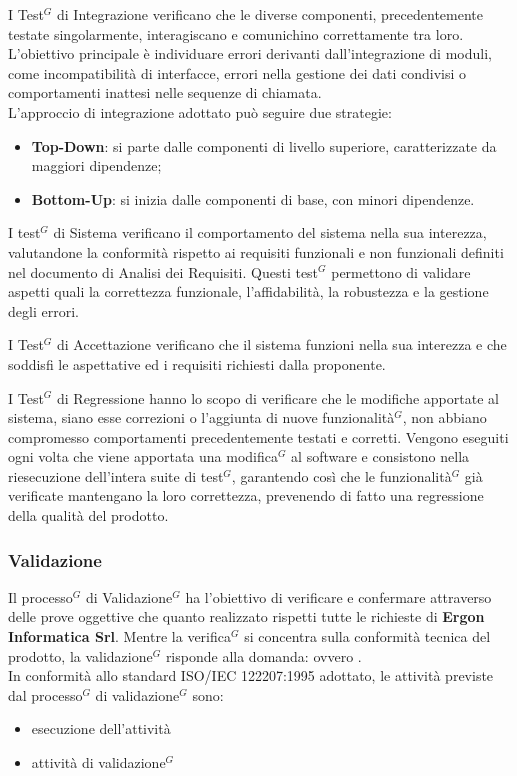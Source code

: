 I Test$^G$ di Integrazione verificano che le diverse componenti, precedentemente testate singolarmente, interagiscano e comunichino correttamente tra loro.\\
L’obiettivo principale è individuare errori derivanti dall’integrazione di moduli, come incompatibilità di interfacce, errori nella gestione dei dati condivisi o comportamenti inattesi nelle sequenze di chiamata.\\
L'approccio di integrazione adottato può seguire due strategie:
\begin{itemize}
    \item \textbf{Top-Down}: si parte dalle componenti di livello superiore, caratterizzate da maggiori dipendenze;
    \item \textbf{Bottom-Up}: si inizia dalle componenti di base, con minori dipendenze.
\end{itemize}

I test$^G$ di Sistema verificano il comportamento del sistema nella sua interezza, valutandone la conformità rispetto ai requisiti funzionali e non funzionali definiti nel documento di Analisi dei Requisiti. Questi test$^G$ permettono di validare aspetti quali la correttezza funzionale, l'affidabilità, la robustezza e la gestione degli errori.

I Test$^G$ di Accettazione verificano che il sistema funzioni nella sua interezza e che soddisfi le aspettative ed i requisiti richiesti dalla proponente.

I Test$^G$ di Regressione hanno lo scopo di verificare che le modifiche apportate al sistema, siano esse correzioni o l'aggiunta di nuove funzionalità$^G$, non abbiano compromesso comportamenti precedentemente testati e corretti. 
Vengono eseguiti ogni volta che viene apportata una modifica$^G$ al software e consistono nella riesecuzione dell'intera suite di test$^G$, garantendo così che le funzionalità$^G$ già verificate mantengano la loro correttezza, prevenendo di fatto una regressione della qualità del prodotto.

\subsubsection{Validazione}
Il processo$^G$ di Validazione$^G$ ha l'obiettivo di verificare e confermare attraverso delle prove oggettive che quanto realizzato rispetti tutte le richieste di \textbf{Ergon Informatica Srl}.
Mentre la verifica$^G$ si concentra sulla conformità tecnica del prodotto, la validazione$^G$ risponde alla domanda: \textit{} ovvero \textit{}.\\
In conformità allo standard ISO/IEC 122207:1995 adottato, le attività previste dal processo$^G$ di validazione$^G$ sono:
\begin{itemize}
    \item esecuzione dell'attività
    \item attività di validazione$^G$
\end{itemize}


